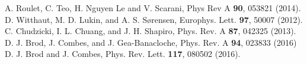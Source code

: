 \documentclass[aps,pra,twocolumn,floatfix,superscriptaddress]{revtex4}
\begin{document}
\begin{thebibliography}{5}
  A. Roulet, C. Teo, H. Nguyen Le and V. Scarani, Phys Rev A {\bf 90}, 053821 (2014). 
 D. Witthaut, M. D. Lukin, and A. S. S\o rensen, Europhys. Lett. {\bf 97}, 50007 (2012).
 C. Chudzicki, I. L. Chuang, and J. H. Shapiro, 
Phys. Rev. A {\bf 87}, 042325 (2013).
 D. J. Brod, J. Combes, and J. Gea-Banacloche,
Phys. Rev. A {\bf 94}, 023833 (2016)
 D. J. Brod and J. Combes,
Phys. Rev. Lett. {\bf 117}, 080502 (2016).
 



\end{thebibliography}

 
\end{document}
